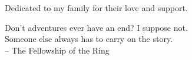 %
\begin{frontmatter}

%
%
\makefrontmatter

%
%
%
%
%
%
\begin{dedication}
Dedicated to my family for their love and support.
\end{dedication}


%
%



%
%
\begin{epigraph} %
\begin{center}
  Don’t adventures ever have an end? I suppose not.\\
  Someone else always has to carry on the story.\\
  -- The Fellowship of the Ring
\end{center}
\end{epigraph}

%



\end{frontmatter}
